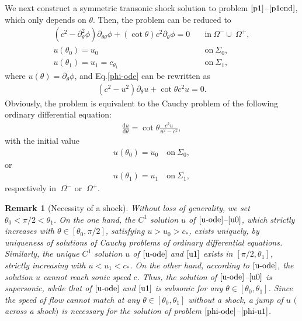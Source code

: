 \documentclass[10pt,a4paper]{amsart}
\newcommand{\dd}{\mathrm{d}}
\newtheorem{remark}{Remark}[section]
\numberwithin{equation}{section}
\begin{document}
We next construct a symmetric transonic shock solution to problem $\eqref{p1}$--$\eqref{p1end}$, which only depends on $\theta$. Then, the problem can be reduced to 
       \begin{align}
		(c^2-\partial^2_\theta\phi)\partial_{\theta\theta}\phi+(\cot\theta) c^2\partial_\theta \phi=0\quad &\text{in}~\Omega^-\cup ~\Omega^+,\label{phi-ode}\\
		u(\theta_0)=u_0\quad &\text{on}~\Sigma_0,\label{phi-u0}\\
		u(\theta_1)=u_1=c_{\theta_1}\quad &\text{on}~\Sigma_1,\label{phi-u1}
	\end{align}
where $u(\theta)=\partial_\theta\phi$, and Eq.\eqref{phi-ode} can be rewritten as
	\begin{align*}
		(c^2-u^2)\partial_{\theta}u+\cot\theta c^2u=0.
	\end{align*} 
Obviously, the problem is equivalent to the Cauchy problem of the following ordinary differential equation:
	\begin{align}\label{u-ode}
		\frac{\dd u}{\dd \theta }=\cot\theta \frac{c^2u}{u^2-c^2},
	\end{align}
with the initial value
	\begin{align}\label{u0}
		u(\theta_0)=u_0 \quad \text{on}~\Sigma_0,
	\end{align}
or
	\begin{align}\label{u1}
		u(\theta_1)=u_1 \quad \text{on}~\Sigma_1,
	\end{align}
respectively in $~\Omega^- $ or $~\Omega^+$.
	
\begin{remark}[Necessity of a shock]
Without loss of generality, we set $\theta_0<\pi/2<\theta_1$. On the one hand, the $C^1$ solution $u$ of $\eqref{u-ode}$--$\eqref{u0}$, which strictly increases with $\theta \in[\theta_0, \pi/2] $, satisfying $u>u_0>c_*$, exists uniquely, by uniqueness of solutions of Cauchy problems of ordinary differential equations. Similarly, the unique $C^1$ solution $u$ of $\eqref{u-ode}$ and $\eqref{u1}$ exists  in $[\pi/2, \theta_1]$, strictly increasing with $u<u_1<c_*$. On the other hand, according to $\eqref{u-ode}$, the solution $u$ cannot reach sonic speed $c$. Thus, the solution of $\eqref{u-ode}$--$\eqref{u0}$ is supersonic, while that of $\eqref{u-ode}$ and $\eqref{u1}$ is subsonic for any $\theta\in [\theta_0, \theta_1]$. Since the speed of flow cannot match at any $\theta\in[\theta_0, \theta_1]$ without a shock, a jump of $u$ $($across a shock$)$ is necessary for the solution of problem $\eqref{phi-ode}$--$\eqref{phi-u1}$.
\end{remark}
	
\end{document}
